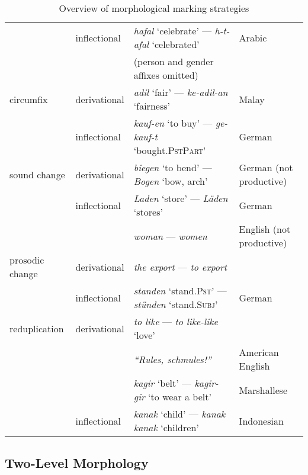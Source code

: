 \begin{table}
\begin{tabular}{llll}
                        & inflectional          & \emph{hafal} `celebrate' --- \emph{h-t-afal} `celebrated'& Arabic\\
                        &                       & (person and gender affixes omitted) & \\
        \midrule
        circumfix       & derivational          & \emph{adil} `fair' --- \emph{ke-adil-an} `fairness'                    & Malay\\
                        & inflectional          & \emph{kauf-en} `to buy' --- \emph{ge-kauf-t} `bought.\textsc{PstPart}' & German\\
        \midrule
        sound change    & derivational          & \emph{biegen} `to bend' --- \emph{Bogen} `bow, arch' & German (not productive)\\
                        & inflectional          & \emph{Laden} `store' --- \emph{Läden} `stores'                         & German\\
                        &                       & \emph{woman} --- \emph{women} & English (not productive)\\
        \midrule
        prosodic change & derivational          & \emph{the export} --- \emph{to export} & \\
                        & inflectional          & \emph{standen} `stand.\textsc{Pst}' --- \emph{stünden} `stand.\textsc{Subj}' & German\\
        \midrule
        reduplication   & derivational          & \emph{to like} --- \emph{to like-like} `love' &\\
                        &                       & \emph{``Rules, schmules!''} & American English\\
                        &                       & \emph{kagir} `belt' --- \emph{kagir-gir} `to wear a belt' & Marshallese\\
                        & inflectional          & \emph{kanak} `child' --- \emph{kanak kanak} `children' & Indonesian \\
        \bottomrule
    \end{tabular}
\caption{Overview of morphological marking strategies}    
\label{tab:Morph_MarkerOverview}
\end{table}

\subsection{Two-Level Morphology}

